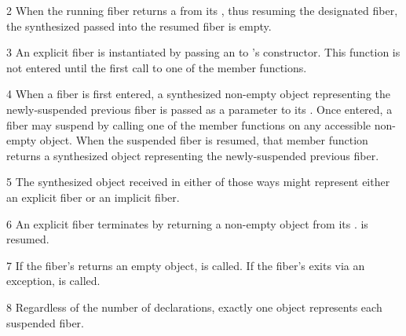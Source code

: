 2 When the running fiber returns a \fiber from its \entryfn, thus resuming the
designated fiber, the synthesized \fiber passed into the resumed fiber is
empty.

3 An explicit fiber is instantiated by passing an \emph{\entryfn} to \fiber's
constructor. This function is not entered until the first call to one of
the \anyresume member functions.

4 When a fiber is first entered, a synthesized non-empty \fiber object
representing the newly-suspended previous fiber is passed as a parameter to
its \entryfn. Once entered, a fiber may suspend by calling one of the \anyresume
member functions on any accessible non-empty \fiber object. When the
suspended fiber is resumed, that member function returns a synthesized \fiber object
representing the newly-suspended previous fiber.

5 The synthesized \fiber object received in either of those ways might
represent either an explicit fiber or an implicit fiber.

6 An explicit fiber terminates by returning a non-empty \fiber object from
its \entryfn.  is resumed.



7 If the fiber's \entryfn returns an empty \fiber object,  is called.
If the fiber's \entryfn exits via an exception,  is called.

8 Regardless of the number of \fiber declarations, exactly one \fiber object
represents each suspended fiber.


